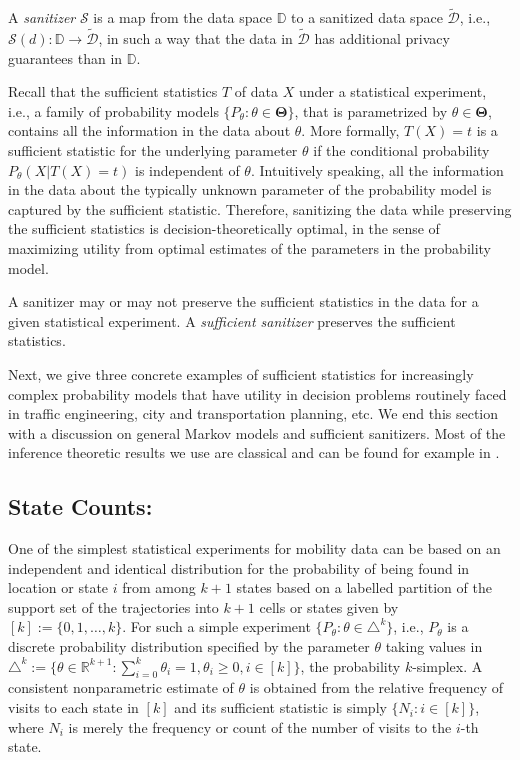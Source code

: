 \documentclass[times,twocolumn,final,authoryear]{elsarticle}
\begin{document}
A {\em sanitizer} $\mathcal{S}$ is a map from the data space $\mathbb{D}$ to a sanitized data space $\tilde{\mathcal{D}}$, i.e., $\mathcal{S}(d): \mathbb{D} \to \tilde{\mathcal{D}}$, in such a way that the data in $\tilde{\mathcal{D}}$ has additional privacy guarantees than in $\mathbb{D}$.
 

Recall that the sufficient statistics $T$ of data $X$ under a statistical experiment, i.e., a family of probability models $\{P_{\theta}: \theta \in \mathbf{\Theta}\}$, that is parametrized by $\theta \in \mathbf{\Theta}$, contains all the information in the data about $\theta$.  
More formally, $T(X)=t$ is a sufficient statistic for the underlying parameter $\theta$ if the conditional probability $P_{\theta}(X | T(X)=t)$ is independent of $\theta$.  
Intuitively speaking, all the information in the data about the typically unknown parameter of the probability model is captured by the sufficient statistic.  
Therefore, sanitizing the data while preserving the sufficient statistics is decision-theoretically optimal, in the sense of maximizing utility from optimal estimates of the parameters in the probability model.

 
A sanitizer may or may not preserve the sufficient statistics in the data for a given statistical experiment.
A {\em sufficient sanitizer} preserves the sufficient statistics. 

Next, we give three concrete examples of sufficient statistics for increasingly complex probability models that have utility in decision problems routinely faced in traffic engineering, city and transportation planning, etc.  
We end this section with a discussion on general Markov models and sufficient sanitizers.  Most of the inference theoretic results we use are classical and can be found for example in \cite{Billingsley:1961}.

\subsection{State Counts:}
One of the simplest statistical experiments for mobility data can be based on an independent and identical distribution for the probability of being found in location or state $i$ from among $k+1$ states based on a labelled partition of the support set of the trajectories into $k+1$ cells or states given by $[k] := \{0,1,\ldots,k\}$.  
For such a simple experiment $\{P_{\theta}: \theta \in \triangle^k \}$, i.e., $P_{\theta}$ is a discrete probability distribution specified by the 
parameter $\theta$ taking values in 
$\triangle^k := \{ \theta \in \mathbb{R}^{k+1} : \sum_{i=0}^k \theta_i = 1, \theta_i \geq 0, i \in [k] \}$, 
the probability $k$-simplex. 
A consistent nonparametric estimate of $\theta$ is obtained from the relative frequency of visits to each state in $[k]$ and its sufficient statistic is simply $\{N_i: i \in [k]\}$, where $N_i$ is merely the frequency or count of the number of visits to the $i$-th state.  
\end{document}
